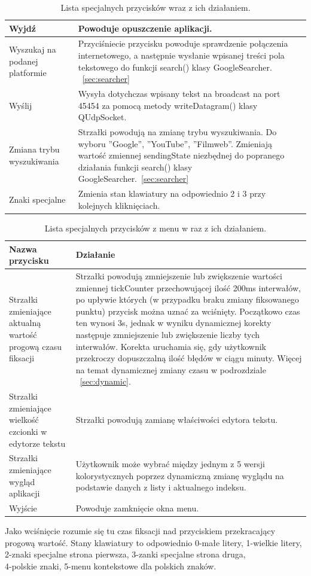 \documentclass[twoside,a4paper]{book}
\begin{document}
\begin{table}
\begin{tabular}{|>{\centering\arraybackslash}m{4cm}|m{8.5cm}|}
     Wyjdź & Powoduje opuszczenie aplikacji.\\ \hline 
      Wyszukaj na podanej platformie & Przyciśniecie przycisku powoduje sprawdzenie połączenia internetowego, a następnie wysłanie wpisanej treści pola tekstowego do funkcji search() klasy GoogleSearcher. ~\ref{sec:searcher}\\ \hline
        Wyślij & Wysyła dotychczas wpisany tekst na broadcast na port 45454 za pomocą metody writeDatagram() klasy QUdpSocket.\\ \hline
    Zmiana trybu wyszukiwania & Strzałki powodują na zmianę trybu wyszukiwania. Do wyboru ''Google'', ''YouTube'', ''Filmweb''. Zmieniają wartość zmiennej sendingState niezbędnej do popranego działania funkcji  search() klasy GoogleSearcher.~\ref{sec:searcher}\\ \hline 
    Znaki specjalne & Zmienia stan kla\-wia\-tury na odpowiednio 2 i 3 przy ko\-lej\-nych kliknięciach. \\ \hline
       \end{tabular}
    \caption{Lista specjalnych przycisków wraz z ich działaniem.} 
    \label{table:specialButtons}
\end{table}
\begin{table}
   \renewcommand\arraystretch{1.5}
 \centering
    \begin{tabular}{|>{\centering\arraybackslash}m{4cm}|m{8.5cm}|}
        \hline
    \textbf{Nazwa przycisku} & \textbf{Działanie}\\ \hline
       Strzałki zmieniające aktualną wartość progową czasu fiksacji & Strzałki powodują zmniejszenie lub zwiększenie wartości zmiennej tickCounter przechowującej ilość 200ms interwałów, po upływie których (w przypadku braku zmiany fiksowanego punktu) przycisk można uznać za wciśnięty. Początkowo czas ten wynosi 3s, jednak w wyniku dynamicznej korekty następuje zmniejszenie lub zwiększenie liczby tych interwałów. Korekta uruchamia się, gdy użytkownik przekroczy dopuszczalną ilość błędów w ciągu minuty. Więcej na temat dynamicznej zmiany czasu w podrozdziale ~\ref{sec:dynamic}. \\ \hline  
       Strzałki zmieniające wielkość czcionki w edytorze tekstu & Strzałki powodują zamianę właściwości edytora tekstu. \\ \hline
       Strzałki zmieniające wygląd aplikacji & Użytkownik może wybrać między jednym z 5 wersji kolorystycznych poprzez dynamiczną zmianę wyglądu na podstawie danych z listy i aktualnego indeksu.  \\ \hline    
       Wyjście & Powoduje zamknięcie okna menu. \\ \hline
    \end{tabular}
    \caption{Lista specjalnych przycisków z menu w raz z ich działaniem.} 
    \label{table:specialButtonsMenu}
\end{table}
Jako wciśnięcie rozumie się tu czas fiksacji nad przyciskiem przekracający progową wartość. Stany klawiatury to odpowiednio 0-małe litery, 1-wielkie litery, 2-znaki specjalne strona pierwsza, 3-zanki specjalne strona druga,\\4-polskie znaki, 5-menu kontekstowe dla polskich znaków.
\end{document}
